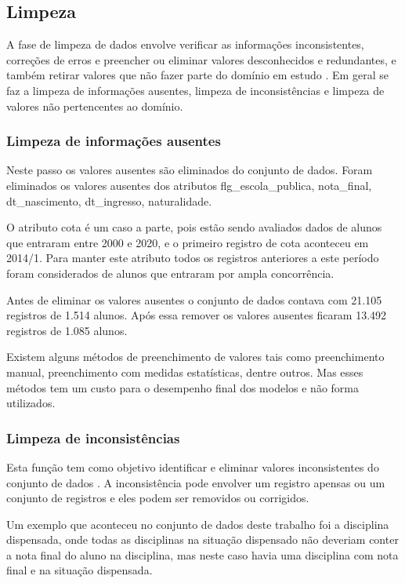 \documentclass[diss,capa]{texufpel}
\begin{document}
\subsection{Limpeza}

A fase de limpeza de dados envolve verificar as informações inconsistentes, correções de erros e preencher ou eliminar valores desconhecidos e redundantes, e também retirar valores que não fazer parte do domínio em estudo \cite{goldschmidt2015data}. Em geral se faz a limpeza de informações ausentes, limpeza de inconsistências e limpeza de valores não pertencentes ao domínio.

\subsubsection{Limpeza de informações ausentes}

Neste passo os valores ausentes são eliminados do conjunto de dados.
Foram eliminados os valores ausentes dos atributos flg\_escola\_publica, nota\_final, dt\_nascimento, dt\_ingresso, naturalidade.

O atributo cota é um caso a parte, pois estão sendo avaliados dados de alunos que entraram entre 2000 e 2020, e o primeiro registro de cota aconteceu em 2014/1. Para manter este atributo todos os registros anteriores a este período foram considerados de alunos que entraram por ampla concorrência.

Antes de eliminar os valores ausentes o conjunto de dados contava com 21.105 registros de 1.514 alunos.
Após essa remover os valores ausentes ficaram 13.492 registros de 1.085 alunos.

Existem alguns métodos de preenchimento de valores tais como preenchimento manual, preenchimento com medidas estatísticas, dentre outros.
Mas esses métodos tem um custo para o desempenho final dos modelos e não forma utilizados.

\subsubsection{Limpeza de inconsistências}

Esta função tem como objetivo identificar e eliminar valores inconsistentes do conjunto de dados \cite{goldschmidt2015data}.
A inconsistência pode envolver um registro apensas ou um conjunto de registros e eles podem ser removidos ou corrigidos.

Um exemplo que aconteceu no conjunto de dados deste trabalho foi a disciplina dispensada, onde todas as disciplinas na situação dispensado não deveriam conter a nota final do aluno na disciplina, mas neste caso havia uma disciplina com nota final e na situação dispensada.
\end{document}
